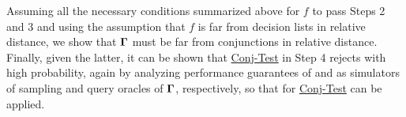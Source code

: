 \documentclass[11pt]{article}
\theoremstyle{definition}
\begin{document}
Assuming all the necessary conditions summarized above for $f$ to pass Steps 2 and 3
and using the assumption that $f$ is far from decision lists in relative distance,
  we show that $\mathbf{\Gamma}$ must be far from conjunctions in relative distance.
Finally, given the latter, it can be shown that \hyperlink{Algorithm2}{\sc Conj-Test} in Step 4 rejects with high probability, again by analyzing performance guarantees of  and  as simulators of sampling and query oracles of $\mathbf{\Gamma}$, respectively, so that   for \hyperlink{Algorithm2}{\sc Conj-Test} can be applied. 
\end{document}
